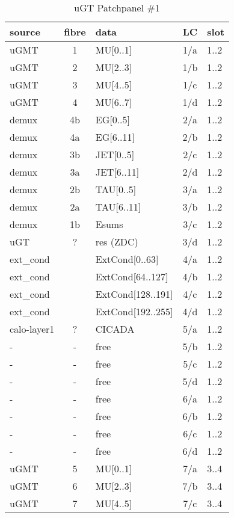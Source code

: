 \begin{longtable}{|l|c|l|c|l|}
\caption{uGT Patchpanel \#1}
    \label{tab:app:ugt_opt_pp_1}\\
\hline
\textbf{source}& \textbf{fibre}& \textbf{data}& \textbf{LC}& \textbf{slot}\\
\hline
\hline
\endhead
uGMT  & 1   & MU[0..1]   & 1/a  & 1..2 \\\hline
uGMT  & 2   & MU[2..3]   & 1/b  & 1..2 \\\hline
uGMT  & 3   & MU[4..5]   & 1/c  & 1..2 \\\hline
uGMT  & 4   & MU[6..7]   & 1/d  & 1..2 \\\hline
demux & 4b  & EG[0..5]   & 2/a  & 1..2 \\\hline
demux & 4a  & EG[6..11]  & 2/b  & 1..2 \\\hline
demux & 3b  & JET[0..5]  & 2/c  & 1..2 \\\hline
demux & 3a  & JET[6..11] & 2/d  & 1..2 \\\hline
demux & 2b  & TAU[0..5]  & 3/a  & 1..2 \\\hline
demux & 2a  & TAU[6..11] & 3/b  & 1..2 \\\hline
demux & 1b  & Esums      & 3/c  & 1..2 \\\hline
uGT   & ?   & res (ZDC)  & 3/d  & 1..2 \\\hline
ext\_cond &     & ExtCond[0..63]    & 4/a  & 1..2 \\\hline
ext\_cond &     & ExtCond[64..127]  & 4/b  & 1..2 \\\hline
ext\_cond &     & ExtCond[128..191] & 4/c  & 1..2 \\\hline
ext\_cond &     & ExtCond[192..255] & 4/d  & 1..2 \\\hline
calo-layer1 & ? & CICADA & 5/a  & 1..2 \\\hline
- & - & free & 5/b  & 1..2 \\\hline
- & - & free & 5/c  & 1..2 \\\hline
- & - & free & 5/d  & 1..2 \\\hline
- & - & free & 6/a  & 1..2 \\\hline
- & - & free & 6/b  & 1..2 \\\hline
- & - & free & 6/c  & 1..2 \\\hline
- & - & free & 6/d  & 1..2 \\\hline
\hline
uGMT  & 5   & MU[0..1]   & 7/a  & 3..4 \\\hline
uGMT  & 6   & MU[2..3]   & 7/b  & 3..4 \\\hline
uGMT  & 7   & MU[4..5]   & 7/c  & 3..4 \\\hline

\end{longtable}
